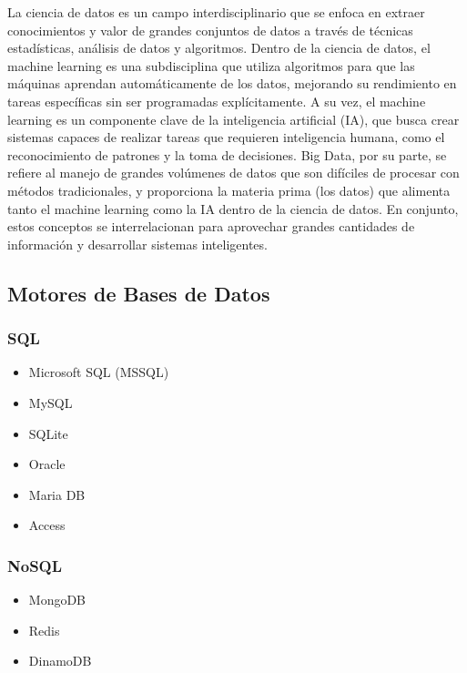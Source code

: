 \documentclass[
  letterpaper,
  DIV=11,
  numbers=noendperiod]{scrartcl}
\begin{document}
La ciencia de datos es un campo interdisciplinario que se enfoca en
extraer conocimientos y valor de grandes conjuntos de datos a través de
técnicas estadísticas, análisis de datos y algoritmos. Dentro de la
ciencia de datos, el machine learning es una subdisciplina que utiliza
algoritmos para que las máquinas aprendan automáticamente de los datos,
mejorando su rendimiento en tareas específicas sin ser programadas
explícitamente. A su vez, el machine learning es un componente clave de
la inteligencia artificial (IA), que busca crear sistemas capaces de
realizar tareas que requieren inteligencia humana, como el
reconocimiento de patrones y la toma de decisiones. Big Data, por su
parte, se refiere al manejo de grandes volúmenes de datos que son
difíciles de procesar con métodos tradicionales, y proporciona la
materia prima (los datos) que alimenta tanto el machine learning como la
IA dentro de la ciencia de datos. En conjunto, estos conceptos se
interrelacionan para aprovechar grandes cantidades de información y
desarrollar sistemas inteligentes.

\subsection{Motores de Bases de Datos}\label{motores-de-bases-de-datos}

\subsubsection{SQL}\label{sql}

\begin{itemize}
\item
  Microsoft SQL (MSSQL)
\item
  MySQL
\item
  SQLite
\item
  Oracle
\item
  Maria DB
\item
  Access
\end{itemize}

\subsubsection{NoSQL}\label{nosql}

\begin{itemize}
\item
  MongoDB
\item
  Redis
\item
  DinamoDB
\end{itemize}
\end{document}
